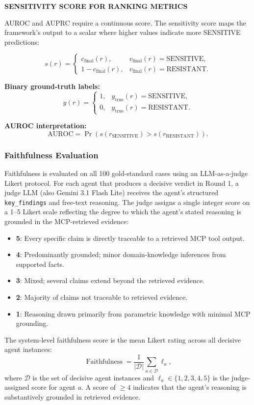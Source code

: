 \documentclass{article}
\begin{document}
\noindent\textbf{SENSITIVITY SCORE FOR RANKING METRICS}

AUROC and AUPRC require a continuous score. The sensitivity score maps the framework's output to a scalar where higher values indicate more SENSITIVE predictions:
   
\[
s(r)
=
\begin{cases}
c_{\mathrm{final}}(r),
& v_{\mathrm{final}}(r)=\mathrm{SENSITIVE},\\[0.5em]
1-c_{\mathrm{final}}(r),
& v_{\mathrm{final}}(r)=\mathrm{RESISTANT}.
\end{cases}
\]

\noindent\textbf{Binary ground-truth labels:}
\[
y(r)
=
\begin{cases}
1, & y_{\mathrm{true}}(r)=\mathrm{SENSITIVE},\\
0, & y_{\mathrm{true}}(r)=\mathrm{RESISTANT}.
\end{cases}
\]

\noindent\textbf{AUROC interpretation:}
\[
\mathrm{AUROC}
=
\Pr\!\left(
s(r_{\mathrm{SENSITIVE}})
>
s(r_{\mathrm{RESISTANT}})
\right).
\]


\subsubsection{Faithfulness Evaluation}
\label{subsec:faithfulness}
Faithfulness is evaluated on all 100 gold-standard cases using an LLM-as-a-judge Likert protocol. For each agent that produces a decisive verdict in Round 1, a judge LLM (also Gemini 3.1 Flash Lite) receives the agent's structured \texttt{key\_findings} and free-text reasoning. The judge assigns a single integer score on a 1--5 Likert scale reflecting the degree to which the agent's stated reasoning is grounded in the MCP-retrieved evidence:
\begin{itemize}[leftmargin=*]
  \item \textbf{5}: Every specific claim is directly traceable to a retrieved MCP tool output.
  \item \textbf{4}: Predominantly grounded; minor domain-knowledge inferences from supported facts.
  \item \textbf{3}: Mixed; several claims extend beyond the retrieved evidence.
  \item \textbf{2}: Majority of claims not traceable to retrieved evidence.
  \item \textbf{1}: Reasoning drawn primarily from parametric knowledge with minimal MCP grounding.
\end{itemize}
The system-level faithfulness score is the mean Likert rating across all decisive agent instances:
\[
\operatorname{Faithfulness} = \frac{1}{|\mathcal{D}|}\sum_{a \in \mathcal{D}} \ell_a,
\]
where $\mathcal{D}$ is the set of decisive agent instances and $\ell_a \in \{1,2,3,4,5\}$ is the judge-assigned score for agent $a$. A score of $\geq 4$ indicates that the agent's reasoning is substantively grounded in retrieved evidence.
\end{document}
